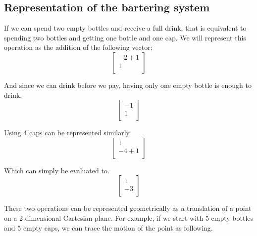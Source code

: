 \documentclass[letterpaper, 12pt]{article}
\begin{document}
\subsection{Representation of the bartering system}
\par If we can spend two empty bottles and receive a full drink, that is equivalent to spending two bottles and getting one bottle and one cap.
We will represent this operation as the addition of the following vector;
\[
    \begin{bmatrix}
       -2 + 1\\
       1\\
    \end{bmatrix}
\]
\par And since we can drink before we pay, having only one empty bottle is enough to drink.
\[
    \begin{bmatrix}
       -1\\
        1\\
    \end{bmatrix}
\]
\par Using 4 caps can be represented similarly
\[
    \begin{bmatrix}
        1\\
        -4 + 1\\
    \end{bmatrix}
\]
\par Which can simply be evaluated to.
\[
    \begin{bmatrix}
         1\\
        -3\\
    \end{bmatrix}
\]
\par These two operations can be represented geometrically as a translation of a point on a 2 dimensional Cartesian plane.
For example, if we start with 5 empty bottles and 5 empty caps, we can trace the motion of the point as following.
\end{document}
